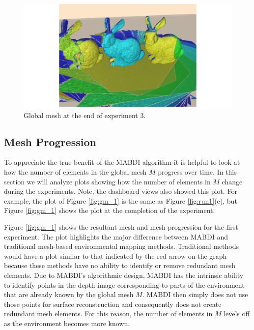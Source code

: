 \begin{figure}[h]%
\centering
  \includegraphics[width=\textwidth]{figures/results_run3_global_mesh.png}
  \caption{Global mesh at the end of experiment 3.}
  \label{fig:gm_3_full}
\end{figure}

\subsection{Mesh Progression}

To appreciate the true benefit of the MABDI algorithm it is helpful to look at
how the number of elements in the global mesh $M$ progress over time. In this
section we will analyze plots showing how the number of elements in $M$ change
during the experiments. Note, the dashboard views also showed this plot. For
example, the plot of Figure \ref{fig:gm_1} is the same as Figure
\ref{fig:run1}(c), but Figure \ref{fig:gm_1} shows the plot at the completion of
the experiment.

Figure \ref{fig:gm_1} shows the resultant mesh and mesh progression for the
first experiment. The plot highlights the major difference between MABDI
and traditional mesh-based environmental mapping methods. Traditional methods
would have a plot similar to that indicated by the red arrow on the graph
because these methods have no ability to identify or remove redundant mesh
elements. Due to MABDI's algorithmic design, MABDI has the intrinsic ability to
identify points in the depth image corresponding to parts of the environment
that are already known by the global mesh $M$. MABDI then simply does not use
those points for surface reconstruction and consequently does not create
redundant mesh elements. For this reason, the number of elements in $M$ levels
off as the environment becomes more known.

